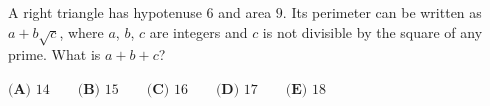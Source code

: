 A right triangle has hypotenuse $6$ and area $9$. Its perimeter can be written as $a+b\sqrt c$, where $a$, $b$, $c$ are integers and $c$ is not divisible by the square of any prime. What is $a+b+c$?

$\textbf{(A) }14\qquad\textbf{(B) }15\qquad\textbf{(C) }16\qquad\textbf{(D) }17\qquad\textbf{(E) }18$
